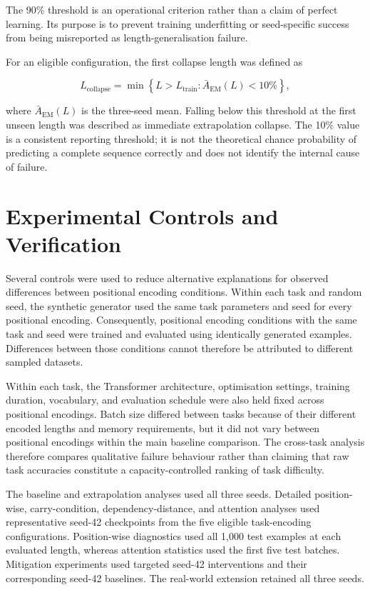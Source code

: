 \documentclass[
    author={Aanchala Ravindra Bhongade},
    supervisor={Dr. Fernando Moreno-Pino},
    degree={MSc},
    title={Length Generalisation in Transformer-Based Sequence Models: Failure Taxonomy and Mitigation Strategies},
    subtitle={},
    type={},
    year={2026}
]{dissertation}
\begin{document}
The 90\% threshold is an operational criterion rather than a claim of perfect learning. Its purpose is to prevent training underfitting or seed-specific success from being misreported as length-generalisation failure.

For an eligible configuration, the first collapse length was defined as

\begin{equation}
L_{\mathrm{collapse}}
=
\min
\left\{
L>L_{\mathrm{train}}:
\bar{A}_{\mathrm{EM}}(L)<10\%
\right\},
\label{eq:collapse-length}
\end{equation}

where \(\bar{A}_{\mathrm{EM}}(L)\) is the three-seed mean. Falling below this threshold at the first unseen length was described as immediate extrapolation collapse. The 10\% value is a consistent reporting threshold; it is not the theoretical chance probability of predicting a complete sequence correctly and does not identify the internal cause of failure.

\section{Experimental Controls and Verification}
\label{sec:experimental-controls}

Several controls were used to reduce alternative explanations for observed differences between positional encoding conditions. Within each task and random seed, the synthetic generator used the same task parameters and seed for every positional encoding. Consequently, positional encoding conditions
with the same task and seed were trained and evaluated using identically generated examples. Differences between those conditions cannot therefore be attributed to different sampled datasets.

Within each task, the Transformer architecture, optimisation settings, training duration, vocabulary, and evaluation schedule were also held fixed across positional encodings. Batch size differed between tasks because of their different encoded lengths and memory requirements, but it did not vary between positional encodings within the main baseline comparison. The cross-task analysis therefore compares qualitative failure behaviour rather than claiming that raw task accuracies constitute a capacity-controlled ranking of task difficulty.

The baseline and extrapolation analyses used all three seeds. Detailed position-wise, carry-condition, dependency-distance, and attention analyses used representative seed-42 checkpoints from the five eligible task-encoding configurations. Position-wise diagnostics used all 1,000 test examples at each evaluated length, whereas attention statistics used the first five test batches. Mitigation experiments used targeted seed-42 interventions and their corresponding seed-42 baselines. The real-world extension retained all three seeds.
\end{document}
